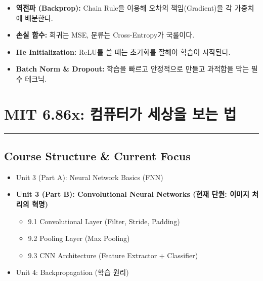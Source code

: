 \documentclass[11pt,a4paper]{book}
\theoremstyle{definition}
\begin{document}
\begin{summarybox}[title={Unit 4 핵심 요약}]
\begin{itemize}
    \item \textbf{역전파 (Backprop):} Chain Rule을 이용해 오차의 책임(Gradient)을 각 가중치에 배분한다.
    \item \textbf{손실 함수:} 회귀는 MSE, 분류는 Cross-Entropy가 국룰이다.
    \item \textbf{He Initialization:} ReLU를 쓸 때는 초기화를 잘해야 학습이 시작된다.
    \item \textbf{Batch Norm \& Dropout:} 학습을 빠르고 안정적으로 만들고 과적합을 막는 필수 테크닉.
\end{itemize}
\end{summarybox}


\chapter{MIT 6.86x: 컴퓨터가 세상을 보는 법}
\label{ch:lecture9}


\vspace{1cm}
\hrule
\vspace{1cm}

\section*{Course Structure \& Current Focus}
\begin{itemize}
    \item Unit 3 (Part A): Neural Network Basics (FNN)
    \item \textbf{\textcolor{mainblue}{Unit 3 (Part B): Convolutional Neural Networks (현재 단원: 이미지 처리의 혁명)}}
    \begin{itemize}
        \item 9.1 Convolutional Layer (Filter, Stride, Padding)
        \item 9.2 Pooling Layer (Max Pooling)
        \item 9.3 CNN Architecture (Feature Extractor + Classifier)
    \end{itemize}
    \item Unit 4: Backpropagation (학습 원리)
\end{itemize}
\end{document}
